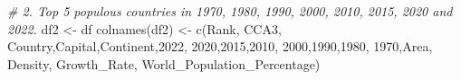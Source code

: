 \documentclass[
]{article}
\newenvironment{Shaded}{\begin{snugshade}}{\end{snugshade}}
\newcommand{\CommentTok}[1]{\textcolor[rgb]{0.56,0.35,0.01}{\textit{#1}}}
\newcommand{\FunctionTok}[1]{\textcolor[rgb]{0.00,0.00,0.00}{#1}}
\newcommand{\NormalTok}[1]{#1}
\newcommand{\OtherTok}[1]{\textcolor[rgb]{0.56,0.35,0.01}{#1}}
\newcommand{\StringTok}[1]{\textcolor[rgb]{0.31,0.60,0.02}{#1}}
\begin{document}
\begin{Shaded}
\begin{Highlighting}[]
\CommentTok{\# 2. Top 5 populous countries in 1970, 1980, 1990, 2000, 2010, 2015, 2020 and 2022.}
\NormalTok{df2 }\OtherTok{\textless{}{-}}\NormalTok{ df}
\FunctionTok{colnames}\NormalTok{(df2) }\OtherTok{\textless{}{-}} \FunctionTok{c}\NormalTok{(}\StringTok{\textquotesingle{}Rank\textquotesingle{}}\NormalTok{, }\StringTok{\textquotesingle{}CCA3\textquotesingle{}}\NormalTok{, }\StringTok{\textquotesingle{}Country\textquotesingle{}}\NormalTok{,}\StringTok{\textquotesingle{}Capital\textquotesingle{}}\NormalTok{,}\StringTok{\textquotesingle{}Continent\textquotesingle{}}\NormalTok{,}\StringTok{\textquotesingle{}2022\textquotesingle{}}\NormalTok{,}
                  \StringTok{\textquotesingle{}2020\textquotesingle{}}\NormalTok{,}\StringTok{\textquotesingle{}2015\textquotesingle{}}\NormalTok{,}\StringTok{\textquotesingle{}2010\textquotesingle{}}\NormalTok{,}
                  \StringTok{\textquotesingle{}2000\textquotesingle{}}\NormalTok{,}\StringTok{\textquotesingle{}1990\textquotesingle{}}\NormalTok{,}\StringTok{\textquotesingle{}1980\textquotesingle{}}\NormalTok{,}
                  \StringTok{\textquotesingle{}1970\textquotesingle{}}\NormalTok{,}\StringTok{\textquotesingle{}Area\textquotesingle{}}\NormalTok{, }\StringTok{\textquotesingle{}Density\textquotesingle{}}\NormalTok{, }\StringTok{\textquotesingle{}Growth\_Rate\textquotesingle{}}\NormalTok{,}
                  \StringTok{\textquotesingle{}World\_Population\_Percentage\textquotesingle{}}\NormalTok{)}


\end{Highlighting}
\end{Shaded}
\end{document}
